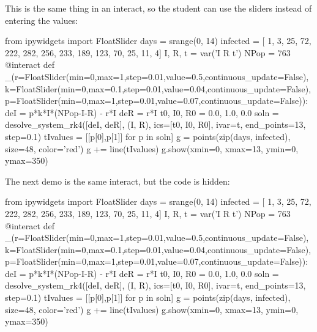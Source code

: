 \documentclass{ximera}
\begin{document}
This is the same thing in an interact, so the student can use the sliders instead of entering the values:
\begin{sageCell}
from ipywidgets import FloatSlider
days = srange(0, 14)
infected = [  1,   3,  25, 72, 222, 282, 256, 
            233, 189, 123, 70,  25,  11,   4]
I, R, t = var('I R t')
NPop = 763
@interact
def _(r=FloatSlider(min=0,max=1,step=0.01,value=0.5,continuous_update=False),
      k=FloatSlider(min=0,max=0.1,step=0.01,value=0.04,continuous_update=False),
      p=FloatSlider(min=0,max=1,step=0.01,value=0.07,continuous_update=False)):
    deI = p*k*I*(NPop-I-R) - r*I
    deR = r*I
    t0, I0, R0 = 0.0, 1.0, 0.0
    soln = desolve_system_rk4([deI, deR], (I, R), 
                               ics=[t0, I0, R0], ivar=t,
                               end_points=13, step=0.1)
    tIvalues = [[p[0],p[1]] for p in soln]
    g = points(zip(days, infected), size=48, color='red')
    g += line(tIvalues)
    g.show(xmin=0, xmax=13, ymin=0, ymax=350)
\end{sageCell}

The next demo is the same interact, but the code is hidden:

\begin{sageOutput}
from ipywidgets import FloatSlider
days = srange(0, 14)
infected = [  1,   3,  25, 72, 222, 282, 256, 
            233, 189, 123, 70,  25,  11,   4]
I, R, t = var('I R t')
NPop = 763
@interact
def _(r=FloatSlider(min=0,max=1,step=0.01,value=0.5,continuous_update=False),
      k=FloatSlider(min=0,max=0.1,step=0.01,value=0.04,continuous_update=False),
      p=FloatSlider(min=0,max=1,step=0.01,value=0.07,continuous_update=False)):
    deI = p*k*I*(NPop-I-R) - r*I
    deR = r*I
    t0, I0, R0 = 0.0, 1.0, 0.0
    soln = desolve_system_rk4([deI, deR], (I, R), 
                               ics=[t0, I0, R0], ivar=t,
                               end_points=13, step=0.1)
    tIvalues = [[p[0],p[1]] for p in soln]
    g = points(zip(days, infected), size=48, color='red')
    g += line(tIvalues)
    g.show(xmin=0, xmax=13, ymin=0, ymax=350)
\end{sageOutput}
\end{document}
